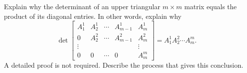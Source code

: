 \begin{exercise}
  \label{ex:hw05:upper-triangular-determinant}
  Explain why the determinant of an upper triangular \(m\times m\)
  matrix equals the product of its diagonal entries. In other words,
  explain why
  \[
    \det\begin{bmatrix}
      A^1_1&A^1_2&\cdots&A^1_{m-1}&A^1_m\\
      0&A^2_2&\cdots&A^2_{m-1}&A^2_m\\
      \vdots&&&&\vdots\\
      0&0&\cdots&0&A^m_m
    \end{bmatrix}=A^1_1 A^2_2\cdots A^m_m.
  \]
  A detailed proof is not required. Describe the process that gives
  this conclusion.
\end{exercise}
